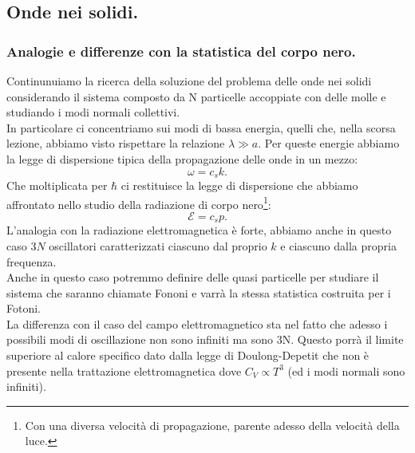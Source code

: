 \subsection{Onde nei solidi.}
\label{subsec:Onde nei solidi.}
\subsubsection{Analogie e differenze con la statistica del corpo nero.}
\label{subsubsec:Analogie e differenze con la statistica del corpo nero.}
Continunuiamo la ricerca della soluzione del problema delle onde nei solidi considerando il sistema composto da N particelle accoppiate con delle molle e studiando i modi normali collettivi.\\ 
In particolare ci concentriamo sui modi di bassa energia, quelli che, nella scorsa lezione, abbiamo visto rispettare la relazione $\lambda \gg a$.
Per queste energie abbiamo la legge di dispersione tipica della propagazione delle onde in un mezzo:
\[
	\omega = c_s k
.\] 
Che moltiplicata per $\hbar$ ci restituisce la legge di dispersione che abbiamo affrontato nello studio della radiazione di corpo nero\footnote{Con una diversa velocità di propagazione, parente adesso della velocità della luce.}:
\[
	\mathcal{E} = c_s p
.\] 
L'analogia con la radiazione elettromagnetica è forte, abbiamo anche in questo caso $3N$ oscillatori caratterizzati ciascuno dal proprio $k$ e ciascuno dalla propria frequenza.\\
Anche in questo caso potremmo definire delle quasi particelle per studiare il sistema che saranno chiamate Fononi e varrà la stessa statistica costruita per i Fotoni.\\
La differenza con il caso del campo elettromagnetico sta nel fatto che adesso i possibili modi di oscillazione non sono infiniti ma sono 3N. Questo porrà il limite superiore al calore specifico dato dalla legge di Doulong-Depetit che non è presente nella trattazione elettromagnetica dove $C_V \propto T^{3}$ (ed i modi normali sono infiniti).\\
